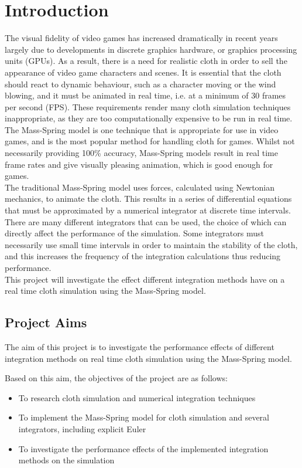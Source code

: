 \chapter{Introduction}

The visual fidelity of video games has increased dramatically in recent years largely due to developments in discrete graphics hardware, or graphics processing units (GPUs). As a result, there is a need for realistic cloth in order to sell the appearance of video game characters and scenes. It is essential that the cloth should react to dynamic behaviour, such as a character moving or the wind blowing, and it must be animated in real time, i.e. at a minimum of 30 frames per second (FPS). These requirements render many cloth simulation techniques inappropriate, as they are too computationally expensive to be run in real time. The Mass-Spring model is one technique that is appropriate for use in video games, and is the most popular method for handling cloth for games. Whilst not necessarily providing 100\% accuracy, Mass-Spring models result in real time frame rates and give visually pleasing animation, which is good enough for games.
\\The traditional Mass-Spring model uses forces, calculated using Newtonian mechanics, to animate the cloth. This results in a series of differential equations that must be approximated by a numerical integrator at discrete time intervals. There are many different integrators that can be used, the choice of which can directly affect the performance of the simulation. Some integrators must necessarily use small time intervals in order to maintain the stability of the cloth, and this increases the frequency of the integration calculations thus reducing performance.
\\This project will investigate the effect different integration methods have on a real time cloth simulation using the Mass-Spring model.

\section{Project Aims}
The aim of this project is to investigate the performance effects of different integration methods on real time cloth simulation using the Mass-Spring model.

Based on this aim, the objectives of the project are as follows:
\begin{itemize}
\item {To research cloth simulation and numerical integration techniques }
\item {To implement the Mass-Spring model for cloth simulation and several integrators, including explicit Euler}
\item {To investigate the performance effects of the implemented integration methods on the simulation}
\end{itemize}

